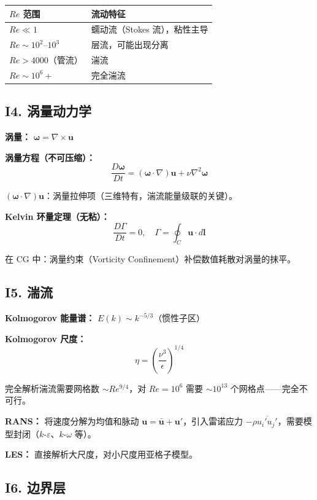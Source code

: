 \begin{center}
\begin{tabular}{ll}
\toprule
\textbf{$Re$ 范围} & \textbf{流动特征} \\
\midrule
$Re \ll 1$ & 蠕动流（Stokes 流），粘性主导 \\
$Re \sim 10^2$--$10^3$ & 层流，可能出现分离 \\
$Re > 4000$（管流） & 湍流 \\
$Re \sim 10^6+$ & 完全湍流 \\
\bottomrule
\end{tabular}
\end{center}

\subsection{I4. 涡量动力学}

\textbf{涡量：} $\boldsymbol{\omega} = \nabla \times \mathbf{u}$

\textbf{涡量方程（不可压缩）：}
\[
\frac{D\boldsymbol{\omega}}{Dt} = (\boldsymbol{\omega}\cdot\nabla)\mathbf{u} + \nu\nabla^2\boldsymbol{\omega}
\]

$(\boldsymbol{\omega}\cdot\nabla)\mathbf{u}$：涡量拉伸项（三维特有，湍流能量级联的关键）。

\textbf{Kelvin 环量定理（无粘）：}
\[
\frac{D\Gamma}{Dt} = 0, \quad \Gamma = \oint_C \mathbf{u}\cdot d\mathbf{l}
\]

在 CG 中：涡量约束（Vorticity Confinement）补偿数值耗散对涡量的抹平。

\subsection{I5. 湍流}

\textbf{Kolmogorov 能量谱：} $E(k) \sim k^{-5/3}$（惯性子区）

\textbf{Kolmogorov 尺度：}
\[
\eta = \left(\frac{\nu^3}{\epsilon}\right)^{1/4}
\]

完全解析湍流需要网格数 $\sim Re^{9/4}$，对 $Re = 10^6$ 需要 $\sim 10^{13}$ 个网格点——完全不可行。

\textbf{RANS：} 将速度分解为均值和脉动 $\mathbf{u} = \bar{\mathbf{u}} + \mathbf{u}'$，引入雷诺应力 $-\rho\overline{u_i'u_j'}$，需要模型封闭（$k$-$\varepsilon$、$k$-$\omega$ 等）。

\textbf{LES：} 直接解析大尺度，对小尺度用亚格子模型。

\subsection{I6. 边界层}

